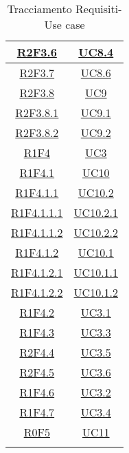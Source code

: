 \begin{longtable}{|c|c|}
\hline
\hyperlink{R2F3.6}{R2F3.6} & \hyperlink{UC8.4}{UC8.4}\\
\hline
\hyperlink{R2F3.7}{R2F3.7} & \hyperlink{UC8.6}{UC8.6}\\
\hline
\hyperlink{R2F3.8}{R2F3.8} & \hyperlink{UC9}{UC9}\\
\hline
\hyperlink{R2F3.8.1}{R2F3.8.1} & \hyperlink{UC9.1}{UC9.1}\\
\hline
\hyperlink{R2F3.8.2}{R2F3.8.2} & \hyperlink{UC9.2}{UC9.2}\\
\hline
\hyperlink{R1F4}{R1F4} & \hyperlink{UC3}{UC3}\\
\hline
\hyperlink{R1F4.1}{R1F4.1} & \hyperlink{UC10}{UC10}\\
\hline
\hyperlink{R1F4.1.1}{R1F4.1.1} & \hyperlink{UC10.2}{UC10.2}\\
\hline
\hyperlink{R1F4.1.1.1}{R1F4.1.1.1} & \hyperlink{UC10.2.1}{UC10.2.1}\\
\hline
\hyperlink{R1F4.1.1.2}{R1F4.1.1.2} & \hyperlink{UC10.2.2}{UC10.2.2}\\
\hline
\hyperlink{R1F4.1.2}{R1F4.1.2} & \hyperlink{UC10.1}{UC10.1}\\
\hline
\hyperlink{R1F4.1.2.1}{R1F4.1.2.1} & \hyperlink{UC10.1.1}{UC10.1.1}\\
\hline
\hyperlink{R1F4.1.2.2}{R1F4.1.2.2} & \hyperlink{UC10.1.2}{UC10.1.2}\\
\hline
\hyperlink{R1F4.2}{R1F4.2} & \hyperlink{UC3.1}{UC3.1}\\
\hline
\hyperlink{R1F4.3}{R1F4.3} & \hyperlink{UC3.3}{UC3.3}\\
\hline
\hyperlink{R2F4.4}{R2F4.4} & \hyperlink{UC3.5}{UC3.5}\\
\hline
\hyperlink{R2F4.5}{R2F4.5} & \hyperlink{UC3.6}{UC3.6}\\
\hline
\hyperlink{R1F4.6}{R1F4.6} & \hyperlink{UC3.2}{UC3.2}\\
\hline
\hyperlink{R1F4.7}{R1F4.7} & \hyperlink{UC3.4}{UC3.4}\\
\hline
\hyperlink{R0F5}{R0F5} & \hyperlink{UC11}{UC11}\\
\hline
\caption[Tracciamento Requisiti-Use case]{Tracciamento Requisiti-Use case}
\label{tabella:requi-usecase}
\end{longtable}
\clearpage
\normalsize
